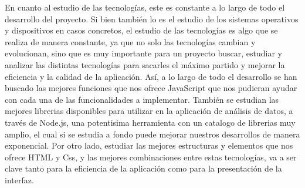 En cuanto al estudio de las tecnologías, este es constante a lo largo de todo el desarrollo del proyecto. Si bien también 
lo es el estudio de los sistemas operativos y dispositivos en casos concretos, el estudio de las tecnologías es algo que se
realiza de manera constante, ya que no solo las tecnologías cambian y evolucionan, sino que es muy importante para un proyecto
buscar, estudiar y analizar las distintas tecnologías para sacarles el máximo partido y mejorar la eficiencia y la calidad de la
aplicación. Así, a lo largo de todo el desarrollo se han buscado las mejores funciones que nos ofrece JavaScript que nos pudieran 
ayudar con cada una de las funcionalidades a implementar. También se estudian las mejores librerias disponibles para utilizar en la
aplicación de análisis de datos, a través de Node.js, una potentisima herramienta con un catalogo de librerias muy amplio, el cual
si se estudia a fondo puede mejorar nuestros desarrollos de manera exponencial. Por otro lado, estudiar las mejores estructuras
y elementos que nos ofrece HTML y Css, y las mejores combinaciones entre estas tecnologías,  va a ser clave tanto para la eficiencia 
de la aplicación como para la presentación de la interfaz.




